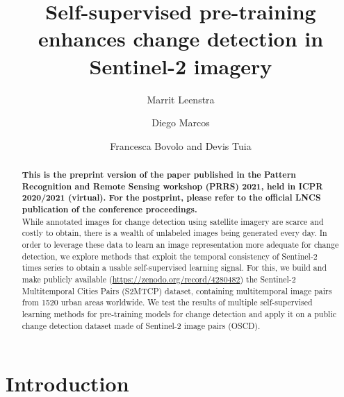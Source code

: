 \documentclass[runningheads]{llncs}
\begin{document}
\title{Self-supervised pre-training enhances change detection in Sentinel-2 imagery}

\author{Marrit Leenstra \and
Diego Marcos \and
Francesca Bovolo and Devis Tuia}

\maketitle              

\begin{abstract}
\textbf{This is the preprint version of the paper published in the Pattern Recognition and Remote Sensing workshop (PRRS) 2021, held in ICPR 2020/2021 (virtual). For the postprint, please refer to the official LNCS publication of the conference proceedings.\\}
While annotated images for change detection using satellite imagery are scarce and costly to obtain, there is a wealth of unlabeled images being generated every day. In order to leverage these data to learn an image representation more adequate for change detection, we explore methods that exploit the temporal consistency of Sentinel-2 times series to obtain a usable self-supervised learning signal. For this, we build and make publicly available {(\url{https://zenodo.org/record/4280482})} the Sentinel-2 Multitemporal Cities Pairs (S2MTCP) dataset, containing multitemporal image pairs from 1520 urban areas worldwide. We test the results of multiple self-supervised learning methods for pre-training models for change detection and apply it on a public change detection dataset made of Sentinel-2 image pairs (OSCD).

\end{abstract}
\section{Introduction}
\end{document}
